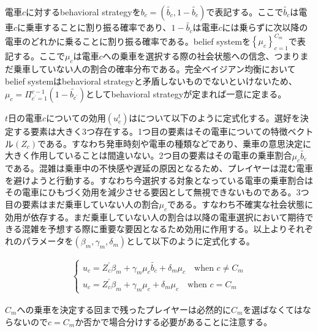 \documentclass{jsarticle}
\begin{document}
電車$c$に対するbehavioral strategyを$b_c = (\tilde{b_c}, 1 - \tilde{b_c})$で表記する。ここで$\tilde{b_c}$は電車$c$に乗車することに割り振る確率であり、$1 - \tilde{b_c}$は電車$c$には乗らずに次以降の電車のどれかに乗ることに割り振る確率である。belief systemを$\left\{ \mu_c \right\}_{c = 1}^{C_m}$で表記する。ここで$\mu_c$は電車$c$への乗車を選択する際の社会状態への信念、つまりまだ乗車していない人の割合の確率分布である。完全ベイジアン均衡においてbelief systemはbehavioral strategyと矛盾しないものでないといけないため、$\mu_c = \Pi_{c^{'} = 1}^{c-1} (1 - \tilde{b_{c^{'}}})$としてbehavioral strategyが定まれば一意に定まる。

$t$日の電車$c$についての効用$(u_c^t)$はについて以下のように定式化する。選好を決定する要素は大きく3つ存在する。1つ目の要素はその電車についての特徴ベクトル$(Z_c)$である。すなわち発車時刻や電車の種類などであり、乗車の意思決定に大きく作用していることは間違いない。2つ目の要素はその電車の乗車割合$\mu_c \tilde{b_c}$である。混雑は乗車中の不快感や遅延の原因となるため、プレイヤーは混む電車を避けようと行動する。すなわち今選択する対象となっている電車の乗車割合はその電車にひもづく効用を減少させる要因として無視できないものである。3つ目の要素はまだ乗車していない人の割合$\mu_c$である。すなわち不確実な社会状態に効用が依存する。まだ乗車していない人の割合は以降の電車選択において期待できる混雑を予想する際に重要な要因となるため効用に作用する。以上よりそれぞれのパラメータを$(\beta_m, \gamma_m, \delta_m)$として以下のように定式化する。

\begin{align*}
	\begin{cases}
	u_c = Z_c^{'} \beta_m + \gamma_m \mu_{c} \tilde{b_c} + \delta_m \mu_c\quad \text{when $c \neq C_m$}\\[8pt]
	u_{c} = Z_c^{'} \beta_m + \gamma_m \mu_{c} + \delta_m \mu_c\quad \text{when $c = C_m$}
	\end{cases}
\end{align*}

$C_m$への乗車を決定する回まで残ったプレイヤーは必然的に$C_m$を選ばなくてはならないので$c = C_m$か否かで場合分けする必要があることに注意する。
\end{document}
